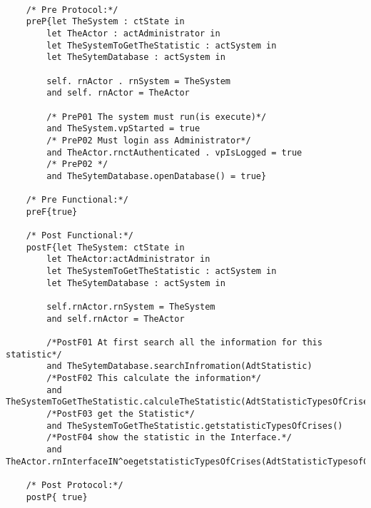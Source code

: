 	\scriptsize
	\vspace{0.5cm}
	\begin{lstlisting}[style=MessirStyle,firstnumber=auto,captionpos=b,caption={\msrmessir (MCL-oriented) specification of the operation \emph{oegetstatisticTypesOfCrises}.},label=OM-actAdministrator-oegetstatisticTypesOfCrises-MCL-LST]

	/* Pre Protocol:*/ 
	preP{let TheSystem : ctState in 
		let TheActor : actAdministrator in 
		let TheSystemToGetTheStatistic : actSystem in 
		let TheSytemDatabase : actSystem in 
		
		self. rnActor . rnSystem = TheSystem 
		and self. rnActor = TheActor
		
		/* PreP01 The system must run(is execute)*/
		and TheSystem.vpStarted = true
		/* PreP02 Must login ass Administrator*/
		and TheActor.rnctAuthenticated . vpIsLogged = true
		/* PreP02 */
		and TheSytemDatabase.openDatabase() = true}
	
	/* Pre Functional:*/
	preF{true}
	
	/* Post Functional:*/ 
	postF{let TheSystem: ctState in
	    let TheActor:actAdministrator in
	    let TheSystemToGetTheStatistic : actSystem in
	    let TheSytemDatabase : actSystem in 
	    
		self.rnActor.rnSystem = TheSystem
	    and self.rnActor = TheActor
	    
	    /*PostF01 At first search all the information for this statistic*/
	    and TheSytemDatabase.searchInfromation(AdtStatistic)
	    /*PostF02 This calculate the information*/
	    and TheSystemToGetTheStatistic.calculeTheStatistic(AdtStatisticTypesOfCrises)
	    /*PostF03 get the Statistic*/
	    and TheSystemToGetTheStatistic.getstatisticTypesOfCrises()
	   	/*PostF04 show the statistic in the Interface.*/
	   	and TheActor.rnInterfaceIN^oegetstatisticTypesOfCrises(AdtStatisticTypesofCrises)}
	
	/* Post Protocol:*/ 
	postP{ true}
	
	\end{lstlisting}
	\normalsize 
	
	
	
	





